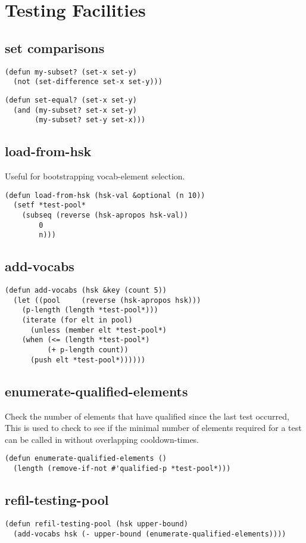 \documentclass[11pt]{article}
\begin{document}
\section{Testing Facilities}
\label{sec-8}
\subsection{set comparisons}
\label{sec-8-1}
\begin{verbatim}
(defun my-subset? (set-x set-y)
  (not (set-difference set-x set-y)))
\end{verbatim}
\begin{verbatim}
(defun set-equal? (set-x set-y)
  (and (my-subset? set-x set-y)
       (my-subset? set-y set-x)))
\end{verbatim}
\subsection{load-from-hsk}
\label{sec-8-2}
Useful for bootstrapping vocab-element selection.
\begin{verbatim}
(defun load-from-hsk (hsk-val &optional (n 10))
  (setf *test-pool*
	(subseq (reverse (hsk-apropos hsk-val))
		0
		n)))
\end{verbatim}
\subsection{add-vocabs}
\label{sec-8-3}
\begin{verbatim}
(defun add-vocabs (hsk &key (count 5))
  (let ((pool     (reverse (hsk-apropos hsk)))
	(p-length (length *test-pool*)))
    (iterate (for elt in pool)
      (unless (member elt *test-pool*)
	(when (<= (length *test-pool*)
		  (+ p-length count))
	  (push elt *test-pool*))))))
\end{verbatim}
\subsection{enumerate-qualified-elements}
\label{sec-8-4}
Check the number of elements that have qualified since the last test occurred,
This is used to check to see if the minimal number of elements required for a
test can be called in without overlapping cooldown-times.
\begin{verbatim}
(defun enumerate-qualified-elements ()
  (length (remove-if-not #'qualified-p *test-pool*)))
\end{verbatim}
\subsection{refil-testing-pool}
\label{sec-8-5}
\begin{verbatim}
(defun refil-testing-pool (hsk upper-bound)
  (add-vocabs hsk (- upper-bound (enumerate-qualified-elements))))
\end{verbatim}
\end{document}
